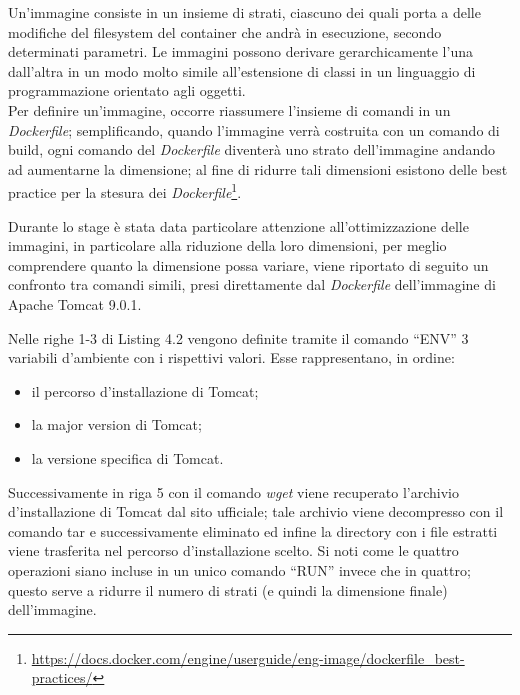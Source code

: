 Un'\gls{immagine} consiste in un insieme di strati, ciascuno dei quali porta a delle modifiche del filesystem del \gls{container} che andrà in esecuzione, secondo determinati parametri. Le immagini possono derivare gerarchicamente l'una dall'altra in un modo molto simile all'estensione di classi in un linguaggio di programmazione orientato agli oggetti. \\ 

Per definire un'immagine, occorre riassumere l'insieme di comandi in un \textit{Dockerfile}; semplificando, quando l'immagine verrà costruita con un comando di build, ogni comando del \textit{Dockerfile} diventerà uno strato dell'immagine andando ad aumentarne la dimensione; al fine di ridurre tali dimensioni esistono delle best practice per la stesura dei \textit{Dockerfile}\footnote{\url{https://docs.docker.com/engine/userguide/eng-image/dockerfile_best-practices/}}.

Durante lo stage è stata data particolare attenzione all'ottimizzazione delle immagini, in particolare alla riduzione della loro dimensioni, per meglio comprendere quanto la dimensione possa variare, viene riportato di seguito un confronto tra comandi simili, presi direttamente dal \textit{Dockerfile} dell'immagine di Apache Tomcat 9.0.1.

  

Nelle righe 1-3 di Listing 4.2 vengono definite tramite il comando ``ENV'' 3 variabili d'ambiente con i rispettivi valori. Esse rappresentano, in ordine:
\begin{itemize}
    \item il percorso d'installazione di Tomcat;
    \item la major version di Tomcat;
    \item la versione specifica di Tomcat.
\end{itemize} 
Successivamente in riga 5 con il comando \textit{wget} viene recuperato l'archivio d'installazione di Tomcat dal sito ufficiale; tale archivio viene decompresso con il comando tar e successivamente eliminato ed infine la directory con i file estratti viene trasferita nel percorso d'installazione scelto. Si noti come le quattro operazioni siano incluse in un unico comando ``RUN'' invece che in quattro; questo serve a ridurre il numero di strati (e quindi la dimensione finale) dell'immagine.\\

